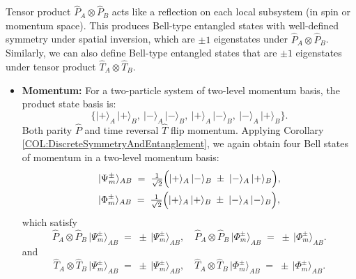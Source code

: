 \documentclass[12pt,a4paper]{article}
\begin{document}
Tensor product $\hat{P}_A \otimes \hat{P}_B$ acts like a reflection on each local subsystem (in spin or momentum space).
This produces Bell-type entangled states with well-defined symmetry under spatial inversion, which are $\pm1$ eigenstates under $\hat{P}_A \otimes \hat{P}_B$.
Similarly, we can also define Bell-type entangled states that are $\pm1$ eigenstates under tensor product $\hat{T}_A \otimes \hat{T}_B$.


\begin{itemize}
	\item \textbf{Momentum:}	
	For a two-particle system of two-level momentum basis, the product state basis is:
	$$
	\{
	\lvert + \rangle_A\,\lvert + \rangle_B, ~
	\lvert - \rangle_A\,\lvert - \rangle_B, ~
	\lvert + \rangle_A\,\lvert - \rangle_B, ~
	\lvert - \rangle_A\,\lvert + \rangle_B
	\}.
	$$
	Both parity $\hat{P}$ and time reversal $\hat{T}$ flip momentum.
	Applying Corollary \ref{COL:DiscreteSymmetryAndEntanglement}, we again obtain four Bell states of momentum in a two-level momentum basis:
	\begin{align}\label{MomentumBellStates}
		\begin{aligned}
			&\lvert \Psi_m^{\pm} \rangle_{AB}
			\;=\;
			\tfrac{1}{\sqrt{2}}
			\Bigl(
			\lvert +\rangle_A \,\lvert -\rangle_B
			\;\pm\;
			\lvert -\rangle_A \,\lvert +\rangle_B
			\Bigr), \\
			&\lvert \Phi_m^{\pm} \rangle_{AB}
			\;=\;
			\tfrac{1}{\sqrt{2}}
			\Bigl(
			\lvert +\rangle_A \,\lvert +\rangle_B
			\;\pm\;
			\lvert -\rangle_A \,\lvert -\rangle_B
			\Bigr),
		\end{aligned}
	\end{align}
	which satisfy
	\[
	\hat{P}_A \otimes \hat{P}_B \,\lvert \Psi_m^{\pm} \rangle_{AB} \;=\; \pm\,\lvert \Psi_m^{\pm} \rangle_{AB},
	\quad
	\hat{P}_A \otimes \hat{P}_B \,\lvert \Phi_m^{\pm} \rangle_{AB} \;=\; \pm\,\lvert \Phi_m^{\pm} \rangle_{AB}.
	\]
	and
	\[
	\hat{T}_A \otimes \hat{T}_B\,\lvert \Psi_m^{\pm} \rangle_{AB} \;=\; \pm\,\lvert \Psi_m^{\pm} \rangle_{AB},
	\quad
	\hat{T}_A \otimes \hat{T}_B\,\lvert \Phi_m^{\pm} \rangle_{AB} \;=\; \pm\, \lvert \Phi_m^{\pm} \rangle_{AB}.
	\]
	

\end{itemize}
\end{document}
